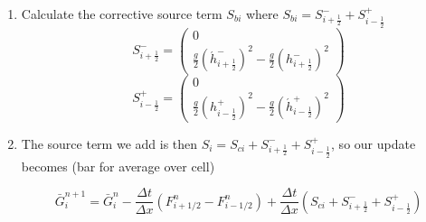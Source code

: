 \documentclass[12pt]{article}
\begin{document}
\begin{enumerate}
\[\begin{array}{c}
    \end{array}\right)\]
    by a finite difference approach so that:
    \begin{align*}
     h &= h_i \\
     u &= u_i \\ 
     -\frac{\partial b}{\partial x} &= \frac{b^{-}_{i + \frac{1}{2}} - b^{+}_{i - \frac{1}{2}}}{\Delta x}\\
     -\frac{\partial u}{\partial x} &= \frac{u^{-}_{i + \frac{1}{2}} - u^{+}_{i - \frac{1}{2}}}{\Delta x} \\
     \frac{\partial^2 b}{\partial x^2} &= \frac{b_{i+1} - 2 b_i + b_{i-1}}{\Delta x^2}
    \end{align*}
  \item Calculate the corrective source term $S_{bi}$ where $S_{bi} = S^{-}_{i + \frac{1}{2}} + S^{+}_{i - \frac{1}{2}}$
  \[S^{-}_{i + \frac{1}{2}} = \left(\begin{array}{c} 0 \\ \frac{g}{2} \left(\acute{h}^{-}_{i + \frac{1}{2}} \right)^2 - \frac{g}{2} \left(h^{-}_{i + \frac{1}{2}} \right)^2  \end{array}\right) \]
  \[S^{+}_{i - \frac{1}{2}} = \left(\begin{array}{c} 0 \\ \frac{g}{2} \left(h^{+}_{i - \frac{1}{2}}\right)^2 - \frac{g}{2}\left(\acute{h}^{+}_{i - \frac{1}{2}}\right)^2  \end{array}\right) \]
  \item The source term we add is then $S_i = S_{ci} + S^{-}_{i + \frac{1}{2}} + S^{+}_{i - \frac{1}{2}}$, so our update becomes (bar for average over cell)
  
  \[\bar{G}^{n+1}_i = \bar{G}^{n}_i - \frac{\Delta t}{\Delta x}(F^n_{i+ 1/2} -F^n_{i- 1/2}) + \frac{\Delta t}{\Delta x}\left(S_{ci} + S^{-}_{i + \frac{1}{2}} + S^{+}_{i - \frac{1}{2}}\right) \]
\end{enumerate}
\end{document}
